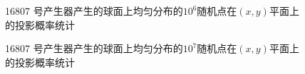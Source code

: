\documentclass[a4paper,11pt]{article}
\begin{document}
\begin{figure}[!htbp]   
\centering     
{}
\caption{16807 号产生器产生的球面上均匀分布的$10^{6}$随机点在$(x,y)$平面上的投影概率统计}      
\end{figure}

\begin{figure}[!htbp]   
\centering     
{}
\caption{16807 号产生器产生的球面上均匀分布的$10^{7}$随机点在$(x,y)$平面上的投影概率统计}      
\end{figure}
\end{document}
